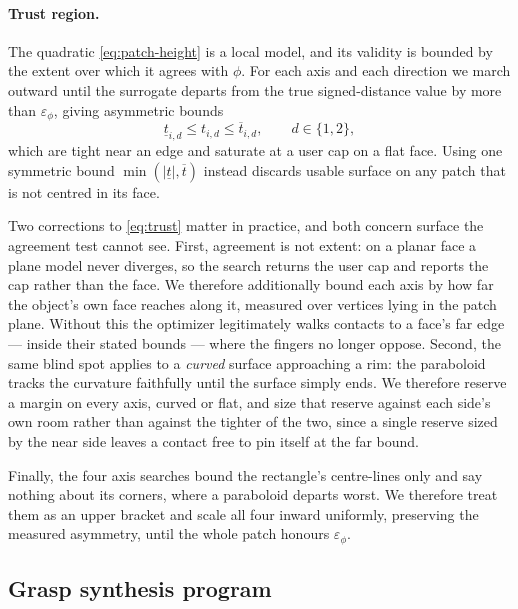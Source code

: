 \paragraph{Trust region.}
The quadratic \eqref{eq:patch-height} is a local model, and its validity is
bounded by the extent over which it agrees with $\phi$. For each axis and each
direction we march outward until the surrogate departs from the true
signed-distance value by more than $\varepsilon_\phi$, giving asymmetric bounds
%
\begin{equation}
  \underline{t}_{i,d} \le t_{i,d} \le \overline{t}_{i,d}, \qquad d \in \{1,2\},
  \label{eq:trust}
\end{equation}
%
which are tight near an edge and saturate at a user cap on a flat face. Using
one symmetric bound $\min(\lvert \underline{t} \rvert, \overline{t})$ instead
discards usable surface on any patch that is not centred in its face.

Two corrections to \eqref{eq:trust} matter in practice, and both concern surface the
agreement test cannot see. First, agreement is not extent: on a planar face a plane
model never diverges, so the search returns the user cap and reports the cap rather
than the face. We therefore additionally bound each axis by how far the object's own
face reaches along it, measured over vertices lying in the patch plane. Without this
the optimizer legitimately walks contacts to a face's far edge --- inside their stated
bounds --- where the fingers no longer oppose. Second, the same blind spot applies to
a \emph{curved} surface approaching a rim: the paraboloid tracks the curvature
faithfully until the surface simply ends. We therefore reserve a margin on every axis,
curved or flat, and size that reserve against each side's own room rather than against
the tighter of the two, since a single reserve sized by the near side leaves a contact
free to pin itself at the far bound.

Finally, the four axis searches bound the rectangle's centre-lines only and say nothing
about its corners, where a paraboloid departs worst. We therefore treat them as an
upper bracket and scale all four inward uniformly, preserving the measured asymmetry,
until the whole patch honours $\varepsilon_\phi$.

\subsection{Grasp synthesis program}
\label{sec:nlp}

